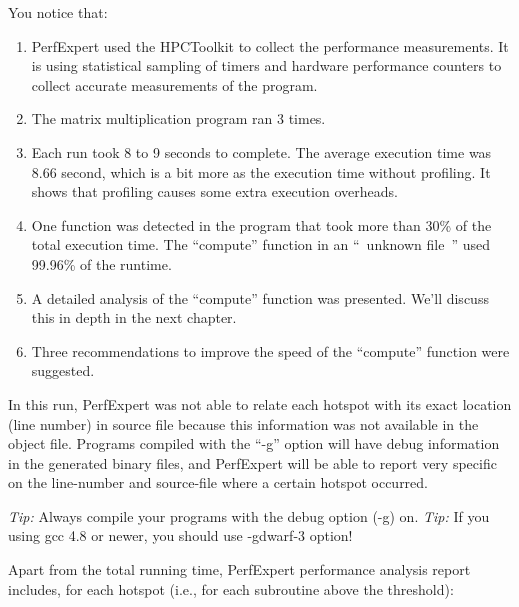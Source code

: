 You notice that:

\begin{enumerate}
  \item  PerfExpert used the HPCToolkit to collect the performance measurements. It is using statistical sampling of timers and hardware performance counters to collect accurate measurements of the program.
  \item  The matrix multiplication program ran 3 times.
  \item  Each run took 8 to 9 seconds to complete. The average execution time was 8.66 second, which is a bit more as the execution time without profiling. It shows that profiling causes some extra execution overheads.
  \item  One function was detected in the program that took more than 30\% of the total execution time. The ``compute'' function in an ``~unknown file~'' used 99.96\% of the runtime.
  \item  A detailed analysis of the ``compute'' function was presented. We'll discuss this in depth in the next chapter.
  \item  Three recommendations to improve the speed of the ``compute'' function were suggested.
\end{enumerate}

In this run, PerfExpert was not able to relate each hotspot with its exact location (line number) in source file because this information was not available in the object file. Programs compiled with the ``-g'' option will have debug information in the generated binary files, and PerfExpert will be able to report very specific on the line-number and source-file where a certain hotspot occurred.

\emph{Tip:} Always compile your programs with the debug option (-g) on.
\emph{Tip:} If you using gcc 4.8 or newer, you should use -gdwarf-3 option!

Apart from the total running time, PerfExpert performance analysis report includes, for each hotspot (i.e., for each subroutine above the threshold):

